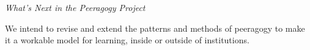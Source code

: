 \begin{framed}
\noindent 
\emph{What's Next in the Peeragogy Project}
\begin{collectinmacro}{\PeeragogyWN}{}{}
We intend to revise and extend the patterns and methods of peeragogy to make it a workable model for learning, inside or outside of institutions.
\end{collectinmacro}
\PeeragogyWN
\end{framed}



  

  
  
  
  
  
  
  
